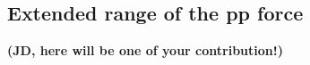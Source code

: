 \subsection{Extended range of the pp force}
\label{subsec:extendedpp}


{\bf (JD, here will be one of your contribution!)}
